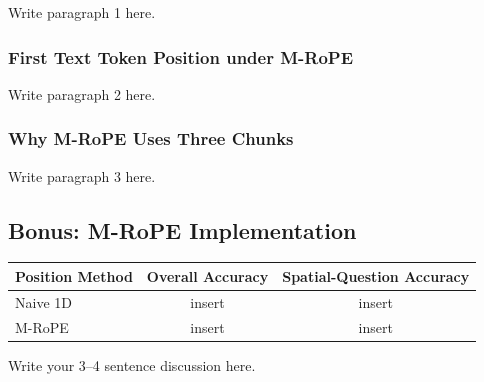 \documentclass[11pt]{article}
\begin{document}
Write paragraph 1 here.

\subsubsection*{First Text Token Position under M-RoPE}

Write paragraph 2 here.

\subsubsection*{Why M-RoPE Uses Three Chunks}

Write paragraph 3 here.

\subsection*{Bonus: M-RoPE Implementation}

\begin{center}
\begin{tabular}{l c c}
\toprule
Position Method & Overall Accuracy & Spatial-Question Accuracy \\
\midrule
Naive 1D & insert & insert \\
M-RoPE & insert & insert \\
\bottomrule
\end{tabular}
\end{center}

Write your 3--4 sentence discussion here.
\end{document}
